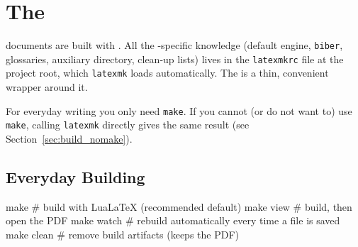 

%

\chapter{The }
\label{app:build}

\novathesis{} documents are built with .
All the -specific knowledge (default engine, \texttt{biber},
glossaries, auxiliary directory, clean-up lists) lives in the
\verb!latexmkrc! file at the project root, which \texttt{latexmk} loads
automatically.  The  is a
thin, convenient wrapper around it.

For everyday writing you only need \texttt{make}.  If you cannot (or do not
want to) use \texttt{make}, calling \texttt{latexmk} directly gives the same
result (see Section~\ref{sec:build_nomake}).


\section{Everyday Building}
\label{sec:build_everyday}

\begin{bashcode}
make            # build with LuaLaTeX (recommended default)
make view       # build, then open the PDF
make watch      # rebuild automatically every time a file is saved
make clean      # remove build artifacts (keeps the PDF)
\end{bashcode}

